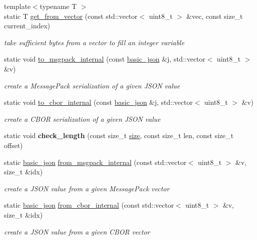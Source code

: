 \begin{DoxyCompactItemize}
\item 
{\footnotesize template$<$typename T $>$ }\\static T \hyperlink{classnlohmann_1_1basic__json_aba6671aa3c2564607b9b383c752f85b3}{get\+\_\+from\+\_\+vector} (const std\+::vector$<$ uint8\+\_\+t $>$ \&vec, const size\+\_\+t current\+\_\+index)
\begin{DoxyCompactList}\small\item\em take sufficient bytes from a vector to fill an integer variable \end{DoxyCompactList}\item 
static void \hyperlink{classnlohmann_1_1basic__json_a68307cfeaa39064be5a94c28361d14d5}{to\+\_\+msgpack\+\_\+internal} (const \hyperlink{classnlohmann_1_1basic__json}{basic\+\_\+json} \&j, std\+::vector$<$ uint8\+\_\+t $>$ \&v)
\begin{DoxyCompactList}\small\item\em create a Message\+Pack serialization of a given J\+S\+O\+N value \end{DoxyCompactList}\item 
static void \hyperlink{classnlohmann_1_1basic__json_ac18a389aeecee6a674ab63288d4061d8}{to\+\_\+cbor\+\_\+internal} (const \hyperlink{classnlohmann_1_1basic__json}{basic\+\_\+json} \&j, std\+::vector$<$ uint8\+\_\+t $>$ \&v)
\begin{DoxyCompactList}\small\item\em create a C\+B\+O\+R serialization of a given J\+S\+O\+N value \end{DoxyCompactList}\item 
\hypertarget{classnlohmann_1_1basic__json_a4028418fcb8ddb27e9e6b93830a78edd}{}static void {\bfseries check\+\_\+length} (const size\+\_\+t \hyperlink{classnlohmann_1_1basic__json_a01833b332b68d9af1f7cd7a816c39e49}{size}, const size\+\_\+t len, const size\+\_\+t offset)\label{classnlohmann_1_1basic__json_a4028418fcb8ddb27e9e6b93830a78edd}

\item 
static \hyperlink{classnlohmann_1_1basic__json}{basic\+\_\+json} \hyperlink{classnlohmann_1_1basic__json_a47546d83310f9101f4f5b3b89b0634d9}{from\+\_\+msgpack\+\_\+internal} (const std\+::vector$<$ uint8\+\_\+t $>$ \&v, size\+\_\+t \&idx)
\begin{DoxyCompactList}\small\item\em create a J\+S\+O\+N value from a given Message\+Pack vector \end{DoxyCompactList}\item 
static \hyperlink{classnlohmann_1_1basic__json}{basic\+\_\+json} \hyperlink{classnlohmann_1_1basic__json_a8e1871a7a77cf24a253aced77b255325}{from\+\_\+cbor\+\_\+internal} (const std\+::vector$<$ uint8\+\_\+t $>$ \&v, size\+\_\+t \&idx)
\begin{DoxyCompactList}\small\item\em create a J\+S\+O\+N value from a given C\+B\+O\+R vector \end{DoxyCompactList}\end{DoxyCompactItemize}
